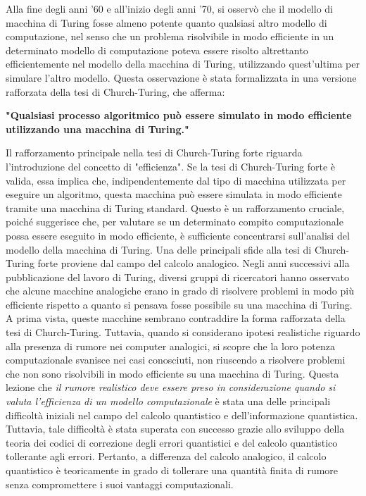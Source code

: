 \documentclass[a4paper,12pt]{report}
\theoremstyle{plain}
\begin{document}
\newpage
\noindent Alla fine degli anni '60 e all'inizio degli anni '70, si osservò che il modello di macchina di Turing fosse almeno potente quanto qualsiasi altro modello di computazione, nel senso che un problema risolvibile in modo efficiente in un determinato modello di computazione poteva essere risolto altrettanto efficientemente nel modello della macchina di Turing, utilizzando quest'ultima per simulare l'altro modello. Questa osservazione è stata formalizzata in una versione rafforzata della tesi di Church-Turing, che afferma:
\begin{center}
  \textbf{"Qualsiasi processo algoritmico può essere simulato in modo efficiente utilizzando una macchina di Turing."}
\end{center}
Il rafforzamento principale nella tesi di Church-Turing forte riguarda l'introduzione del concetto di "efficienza". Se la tesi di Church-Turing forte è valida, essa implica che, indipendentemente dal tipo di macchina utilizzata per eseguire un algoritmo, questa macchina può essere simulata in modo efficiente tramite una macchina di Turing standard. Questo è un rafforzamento cruciale, poiché suggerisce che, per valutare se un determinato compito computazionale possa essere eseguito in modo efficiente, è sufficiente concentrarsi sull'analisi del modello della macchina di Turing.
Una delle principali sfide alla tesi di Church-Turing forte proviene dal campo del calcolo analogico. Negli anni successivi alla pubblicazione del lavoro di Turing, diversi gruppi di ricercatori hanno osservato che alcune macchine analogiche erano in grado di risolvere problemi in modo più efficiente rispetto a quanto si pensava fosse possibile su una macchina di Turing. A prima vista, queste macchine sembrano contraddire la forma rafforzata della tesi di Church-Turing. Tuttavia, quando si considerano ipotesi realistiche riguardo alla presenza di rumore nei computer analogici, si scopre che la loro potenza computazionale svanisce nei casi conosciuti, non riuscendo a risolvere problemi che non sono risolvibili in modo efficiente su una macchina di Turing. Questa lezione che \textit{il rumore realistico deve essere preso in considerazione quando si valuta l'efficienza di un modello computazionale} è stata una delle principali difficoltà iniziali nel campo del calcolo quantistico e dell'informazione quantistica. 
Tuttavia, tale difficoltà è stata superata con successo grazie allo sviluppo della teoria dei codici di correzione degli errori quantistici e del calcolo quantistico tollerante agli errori.
Pertanto, a differenza del calcolo analogico, il calcolo quantistico è teoricamente in grado di tollerare una quantità finita di rumore senza compromettere i suoi vantaggi computazionali.
\end{document}
